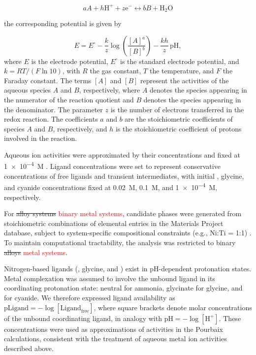 \documentclass[twoside,twocolumn,9pt]{article}
\begin{document}
\begin{equation} \label{eq:reaction}
aA + h\text{H}^+ + z\text{e}^- \leftrightarrow bB + \text{H}_2\text{O}
\end{equation}

the corresponding potential is given by

\begin{equation} \label{eq:nernst}
E = E^\circ - \frac{k}{z} \log \left(\frac{[A]^a}{[B]^b}\right) - \frac{k h}{z} \, \mathrm{pH},
\end{equation}
where \(E\) is the electrode potential, \(E^\circ\) is the standard electrode potential, and \(k = RT/(F \ln 10)\), with \(R\) the gas constant, \(T\) the temperature, and \(F\) the Faraday constant. The terms \([A]\) and \([B]\) represent the activities of the aqueous species \(A\) and \(B\), respectively, where \(A\) denotes the species appearing in the numerator of the reaction quotient and \(B\) denotes the species appearing in the denominator. The parameter \(z\) is the number of electrons transferred in the redox reaction. The coefficients \(a\) and \(b\) are the stoichiometric coefficients of species \(A\) and \(B\), respectively, and \(h\) is the stoichiometric coefficient of protons involved in the reaction.

Aqueous ion activities were approximated by their concentrations and fixed at \SI{1e-4}{M} \cite{Huang2017ImprovedCompounds, Wang2020PredictingFunctional}. Ligand concentrations were set to represent conservative concentrations of free ligands and transient intermediates, with initial , glycine, and cyanide concentrations fixed at \SI{0.02}{M}, \SI{0.1}{M}, and \SI{1e-4}{M}, respectively. 

For \sout{alloy systems} \textcolor{red}{binary metal systems}, candidate phases were generated from stoichiometric combinations of elemental entries in the Materials Project database, subject to system-specific compositional constraints (e.g., Ni:Ti = 1:1) \cite{Thompson2011PourbaixSystems}. To maintain computational tractability, the analysis was restricted to binary \sout{alloys} \textcolor{red}{metal systems}.

Nitrogen-based ligands (, glycine, and ) exist in pH-dependent protonation states. Metal complexation was assumed to involve the unbound ligand in its coordinating protonation state: neutral  for ammonia, glycinate for glycine, and  for cyanide. We therefore expressed ligand availability as
\(\mathrm{pLigand} = -\log[\mathrm{Ligand}_{\mathrm{free}}]\), where square brackets denote molar concentrations of the unbound coordinating ligand, in analogy with $\text{pH} = -\log[\text{H}^+]$. These concentrations were used as approximations of activities in the Pourbaix calculations, consistent with the treatment of aqueous metal ion activities described above.
\end{document}
